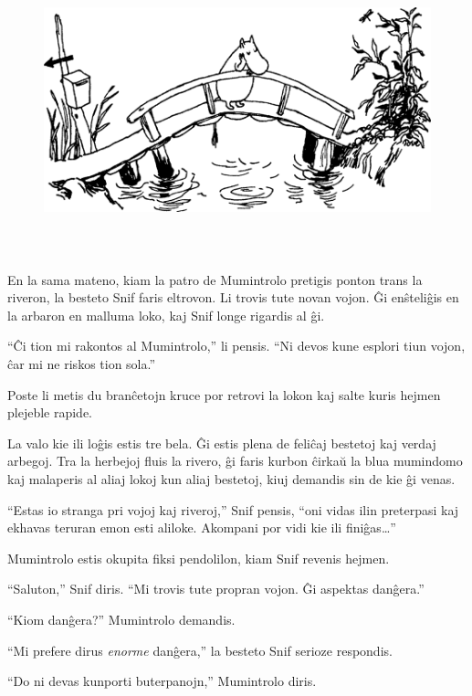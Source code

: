 \begin{figure}[htbp]
\centering
\includegraphics[width=450pt,height=237pt]{1-1.png}
\caption{}
\label{1-1}
\end{figure}

\noindent En la sama mateno, kiam la patro de Mumintrolo pretigis ponton trans la riveron, la besteto Snif faris eltrovon. Li trovis tute novan vojon. Ĝi enŝteliĝis en la arbaron en malluma loko, kaj Snif longe rigardis al ĝi.

``Ĉi tion mi rakontos al Mumintrolo,'' li pensis. ``Ni devos kune esplori tiun vojon, ĉar mi ne riskos tion sola.''

Poste li metis du branĉetojn kruce por retrovi la lokon kaj salte kuris hejmen plejeble rapide.

La valo kie ili loĝis estis tre bela. Ĝi estis plena de feliĉaj bestetoj kaj verdaj arbegoj. Tra la herbejoj fluis la rivero, ĝi faris kurbon ĉirkaŭ la blua mumindomo kaj malaperis al aliaj lokoj kun aliaj bestetoj, kiuj demandis sin de kie ĝi venas.

``Estas io stranga pri vojoj kaj riveroj,'' Snif pensis, ``oni vidas ilin preterpasi kaj ekhavas teruran emon esti aliloke. Akompani por vidi kie ili finiĝas{\ldots}''

\sectionbreak

Mumintrolo estis okupita fiksi pendolilon, kiam Snif revenis hejmen.

``Saluton,'' Snif diris. ``Mi trovis tute propran vojon. Ĝi aspektas danĝera.''

``Kiom danĝera?'' Mumintrolo demandis.

``Mi prefere dirus \emph{enorme} danĝera,'' la besteto Snif serioze respondis.

``Do ni devas kunporti buterpanojn,'' Mumintrolo diris.


